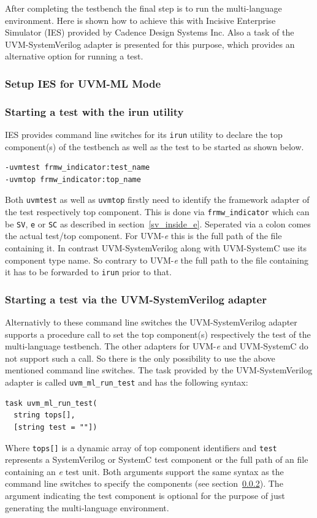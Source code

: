 After completing the testbench the final step is to run the multi-language environment. Here is shown how to achieve
this with Incisive Enterprise Simulator (IES) provided by Cadence Design Systems Inc. Also a task of the
UVM-SystemVerilog adapter is presented for this purpose, which provides an alternative option for running a test.

\subsubsection{Setup IES for UVM-ML Mode}
\subsubsection{Starting a test with the irun utility} \label{uvm_top}

IES provides command line switches for its \lstinline$irun$ utility to declare the top component(s) of the testbench as
well as the test to be started as shown below.
\medskip
{}
\begin{lstlisting}
-uvmtest frmw_indicator:test_name
-uvmtop frmw_indicator:top_name
\end{lstlisting} 
\medskip
Both \lstinline$uvmtest$ as well as \lstinline$uvmtop$ firstly need to identify the framework adapter of the test
respectively top component. This is done via \lstinline$frmw_indicator$ which can be \lstinline$SV$, \lstinline$e$ or
\lstinline$SC$ as described in section~\ref{sv_inside_e}. Seperated via a colon comes the actual test/top component. For
UVM-\textit{e} this is the full path of the file containing it. In contrast UVM-SystemVerilog along with UVM-SystemC use
its component type name. So contrary to UVM-\textit{e} the full path to the file containing it has to be forwarded to
\lstinline$irun$ prior to that.

\subsubsection{Starting a test via the UVM-SystemVerilog adapter}

Alternativly to these command line switches the UVM-SystemVerilog adapter supports a procedure call to set the top
component(s) respectively the test of the multi-language testbench. The other adapters for UVM-\textit{e} and
UVM-SystemC do not support such a call. So there is the only possibility to use the above mentioned command line
switches. The task provided by the UVM-SystemVerilog adapter is called \lstinline$uvm_ml_run_test$ and has the following
syntax:
\medskip
{}
\begin{lstlisting}
task uvm_ml_run_test(
  string tops[],
  [string test = ""])
\end{lstlisting} 
\medskip
Where \lstinline$tops[]$ is a dynamic array of top component identifiers and \lstinline$test$ represents a
SystemVerilog or SystemC test component or the full path of an file containing an \textit{e} test unit. Both arguments
support the same syntax as the command line switches to specify the components (see section~\ref{uvm_top}). The argument
indicating the test component is optional for the purpose of just generating the multi-language environment.